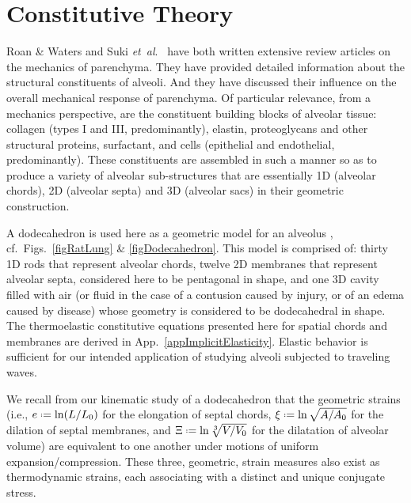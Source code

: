 \part{Constitutive Theory}
\label{partConstitutive}

Roan \& Waters \cite{RoanWaters11} and Suki \textit{et~al}.\ \cite{Sukietal05,Sukietal11} have both written extensive review articles on the mechanics of parenchyma.  They have provided detailed information about the structural constituents of alveoli.  And they have discussed their influence on the overall mechanical response of parenchyma.  Of particular relevance, from a mechanics perspective, are the constituent building blocks of alveolar tissue: collagen (types I and III, predominantly), elastin, proteoglycans and other structural proteins, surfactant, and cells (epithelial and endothelial, predominantly).  These constituents are assembled in such a manner so as to produce a variety of alveolar sub-structures that are essentially 1D (alveolar chords), 2D (alveolar septa) and 3D (alveolar sacs) in their geometric construction.

A dodecahedron is used here as a geometric model for an alveolus \cite{FrankusLee74}, cf.\ Figs.~\ref{figRatLung} \& \ref{figDodecahedron}.  This model is comprised of: thirty 1D rods that represent alveolar chords, twelve 2D membranes that represent alveolar septa, considered here to be pentagonal in shape, and one 3D cavity filled with air (or fluid in the case of a contusion caused by injury, or of an edema caused by disease) whose geometry is considered to be dodecahedral in shape.  The thermo\-elastic constitutive equations presented here for spatial chords and membranes are derived in App.~\ref{appImplicitElasticity}.  Elastic behavior is sufficient for our intended application of studying alveoli subjected to traveling waves.

We recall from our kinematic study of a dodecahedron that the geometric strains (i.e., $e \defeq \ln ( L / L_0 )$ for the elongation of septal chords, $\xi \defeq \ln \sqrt{A / A_0}$ for the dilation of septal membranes, and $\Xi \defeq \ln \sqrt[3]{V / V_0}$ for the dilatation of alveolar volume) are equivalent to one another under motions of uniform expansion\slash compression.  These three, geometric, strain measures also exist as thermo\-dynamic strains, each associating with a distinct and unique conjugate stress. \cite{Freed17,FreedZamani19}


